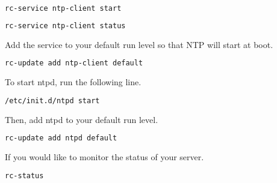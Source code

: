 \documentclass[11pt]{article}
\begin{document}
\begin{lstlisting}[basicstyle=\ttfamily, backgroundcolor = \color{lightgray}, language = bash, xleftmargin = 0cm, framexleftmargin = 1em]
rc-service ntp-client start
\end{lstlisting} 

\begin{lstlisting}[basicstyle=\ttfamily, backgroundcolor = \color{lightgray}, language = bash, xleftmargin = 0cm, framexleftmargin = 1em]
rc-service ntp-client status
\end{lstlisting} 

Add the service to your default run level so that NTP will start at boot.
\begin{lstlisting}[basicstyle=\ttfamily, backgroundcolor = \color{lightgray}, language = bash, xleftmargin = 0cm, framexleftmargin = 1em]
rc-update add ntp-client default
\end{lstlisting} 

To start ntpd, run the following line.
\begin{lstlisting}[basicstyle=\ttfamily, backgroundcolor = \color{lightgray}, language = bash, xleftmargin = 0cm, framexleftmargin = 1em]
/etc/init.d/ntpd start
\end{lstlisting} 



Then, add ntpd to your default run level.

\begin{lstlisting}[basicstyle=\ttfamily, backgroundcolor = \color{lightgray}, language = bash, xleftmargin = 0cm, framexleftmargin = 1em]
rc-update add ntpd default
\end{lstlisting} 



If you would like to monitor the status of your server.
\begin{lstlisting}[basicstyle=\ttfamily, backgroundcolor = \color{lightgray}, language = bash, xleftmargin = 0cm, framexleftmargin = 1em]
rc-status
\end{lstlisting} 


\end{document}
